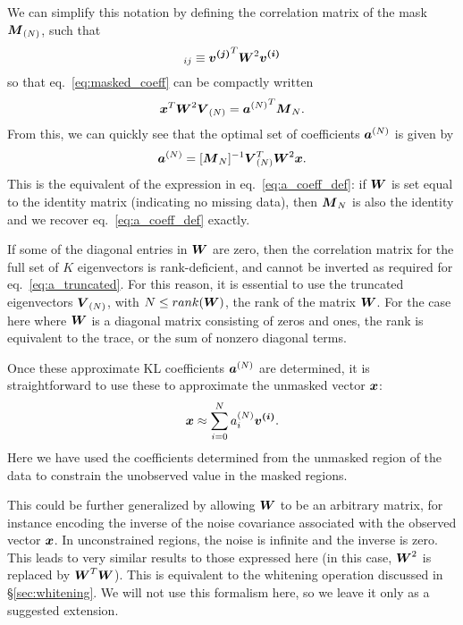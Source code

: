 We can simplify this notation by defining the correlation matrix of the
mask $\boldsymbol{M}_{(N)}$, such that
\begin{equation}
  [\mymat{M}_N]_{ij} \equiv \myvec{v^{(j)}}^T \mymat{W}^2 \mymat{v^{(i)}}
\end{equation}
so that eq.~\ref{eq:masked_coeff} can be compactly written
\begin{equation}
  \boldsymbol{x}^T \boldsymbol{W}^2 \boldsymbol{V}_{(N)}
  = {\boldsymbol{a}^{(N)}}^T \boldsymbol{M}_N.
\end{equation}
From this, we can quickly see that the optimal set of coefficients
$\boldsymbol{a}^{(N)}$ is given by
\begin{equation}
  \label{eq:a_truncated}
  \boldsymbol{a}^{(N)} = [\boldsymbol{M}_N]^{-1}
  \boldsymbol{V}_{(N)}^T \boldsymbol{W}^2 \boldsymbol{x}.
\end{equation}
This is the equivalent of the expression in eq.~\ref{eq:a_coeff_def}:
if $\boldsymbol{W}$ is set equal to the identity matrix (indicating no
missing data), then $\boldsymbol{M}_N$ is also the identity and we recover
eq.~\ref{eq:a_coeff_def} exactly.

If some of the diagonal entries in $\boldsymbol{W}$ are zero, then the
correlation matrix for the full set of $K$ eigenvectors is rank-deficient,
and cannot be inverted as required for eq.~\ref{eq:a_truncated}.  For this
reason, it is essential to use the truncated eigenvectors $\boldsymbol{V}_{(N)}$,
with $N \le rank(\boldsymbol{W})$, the rank of the matrix $\boldsymbol{W}$.  For the
case here where $\boldsymbol{W}$ is a diagonal matrix consisting of zeros and
ones, the rank is equivalent to the trace, or the sum of nonzero diagonal
terms.

Once these approximate KL coefficients $\boldsymbol{a}^{(N)}$ are determined,
it is straightforward to use these to approximate the unmasked vector
$\boldsymbol{x}$:
\begin{equation}
  \boldsymbol{x} \approx \sum_{i=0}^N a_i^{(N)} \boldsymbol{v^{(i)}}.
\end{equation}
Here we have used the coefficients determined from the unmasked region of
the data to constrain the unobserved value in the masked regions.

This could be further generalized by allowing $\boldsymbol{W}$ to be an arbitrary
matrix, for instance encoding the inverse of the noise covariance
associated with the observed vector $\boldsymbol{x}$.  In unconstrained regions,
the noise is infinite and the inverse is zero.  This leads to very similar
results to those expressed here (in this case, $\boldsymbol{W}^2$ is replaced
by $\boldsymbol{W}^T\boldsymbol{W}$).  This is equivalent to the whitening operation
discussed in \S\ref{sec:whitening}.  We will not use this formalism here, so we
leave it only as a suggested extension.


